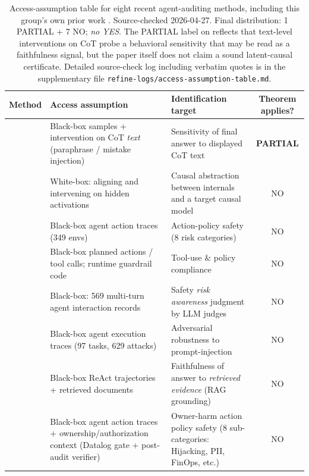 \documentclass{article}
\theoremstyle{plain}
\theoremstyle{definition}
\theoremstyle{remark}
\begin{document}
\begin{table}[h]
\centering\footnotesize
\begin{tabular}{p{3.6cm}p{3.4cm}p{3.4cm}c}
\toprule
Method & Access assumption & Identification target & Theorem applies? \\
\midrule
\citet{lanham2023measuring} & Black-box samples + intervention on CoT \emph{text} (paraphrase / mistake injection) & Sensitivity of final answer to displayed CoT text & \textbf{PARTIAL} \\
\citet{geiger2022inducing,geiger2023causal} & White-box: aligning and intervening on hidden activations & Causal abstraction between internals and a target causal model & NO \\
\citet{zhang2024agentsafetybench} & Black-box agent action traces (349 envs) & Action-policy safety (8 risk categories) & NO \\
\citet{xiang2024guardagent} & Black-box planned actions / tool calls; runtime guardrail code & Tool-use \& policy compliance & NO \\
\citet{yuan2024rjudge} & Black-box: 569 multi-turn agent interaction records & Safety \emph{risk awareness} judgment by LLM judges & NO \\
\citet{debenedetti2024agentdojo} & Black-box agent execution traces (97 tasks, 629 attacks) & Adversarial robustness to prompt-injection & NO \\
\citet{murphy2025faithful} & Black-box ReAct trajectories + retrieved documents & Faithfulness of answer to \emph{retrieved evidence} (RAG grounding) & NO \\
\citet{zhang2026ownerharm} & Black-box agent action traces + ownership/authorization context (Datalog gate + post-audit verifier) & Owner-harm action policy safety (8 sub-categories: Hijacking, PII, FinOps, etc.) & NO \\
\bottomrule
\end{tabular}
\caption{Access-assumption table for eight recent agent-auditing methods,
including this group's own prior work \citep{zhang2026ownerharm}.
Source-checked 2026-04-27. Final distribution: 1 PARTIAL + 7 NO; \emph{no YES}.
The PARTIAL label on \citet{lanham2023measuring} reflects that text-level
interventions on CoT probe a behavioral sensitivity that may be read as a
faithfulness signal, but the paper itself does not claim a sound latent-causal
certificate. Detailed source-check log including verbatim quotes is in the
supplementary file \texttt{refine-logs/access-assumption-table.md}.}
\label{tab:access-table}
\end{table}
\end{document}
